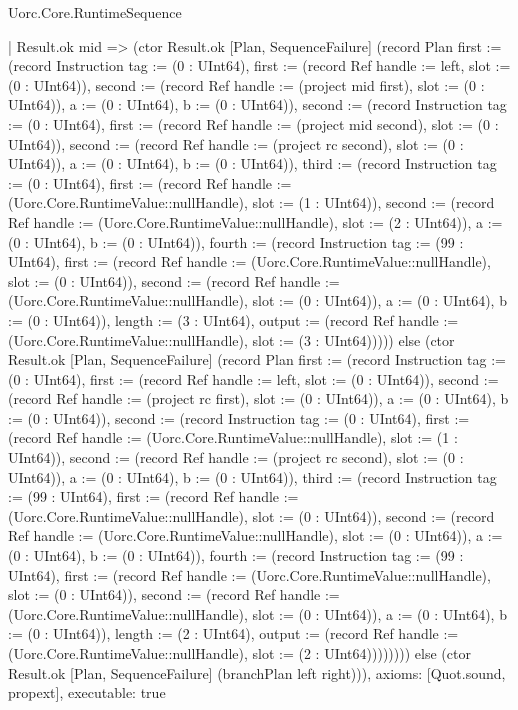 \begin{lexlean}{Uorc.Core.RuntimeSequence}
\begin{semanticmodule}
{          | Result.ok mid => (ctor Result.ok [Plan, SequenceFailure] (record Plan {first := (record Instruction {tag := (0 : UInt64), first := (record Ref {handle := left, slot := (0 : UInt64)}), second := (record Ref {handle := (project mid first), slot := (0 : UInt64)}), a := (0 : UInt64), b := (0 : UInt64)}), second := (record Instruction {tag := (0 : UInt64), first := (record Ref {handle := (project mid second), slot := (0 : UInt64)}), second := (record Ref {handle := (project rc second), slot := (0 : UInt64)}), a := (0 : UInt64), b := (0 : UInt64)}), third := (record Instruction {tag := (0 : UInt64), first := (record Ref {handle := (Uorc.Core.RuntimeValue::nullHandle), slot := (1 : UInt64)}), second := (record Ref {handle := (Uorc.Core.RuntimeValue::nullHandle), slot := (2 : UInt64)}), a := (0 : UInt64), b := (0 : UInt64)}), fourth := (record Instruction {tag := (99 : UInt64), first := (record Ref {handle := (Uorc.Core.RuntimeValue::nullHandle), slot := (0 : UInt64)}), second := (record Ref {handle := (Uorc.Core.RuntimeValue::nullHandle), slot := (0 : UInt64)}), a := (0 : UInt64), b := (0 : UInt64)}), length := (3 : UInt64), output := (record Ref {handle := (Uorc.Core.RuntimeValue::nullHandle), slot := (3 : UInt64)})}))) else (ctor Result.ok [Plan, SequenceFailure] (record Plan {first := (record Instruction {tag := (0 : UInt64), first := (record Ref {handle := left, slot := (0 : UInt64)}), second := (record Ref {handle := (project rc first), slot := (0 : UInt64)}), a := (0 : UInt64), b := (0 : UInt64)}), second := (record Instruction {tag := (0 : UInt64), first := (record Ref {handle := (Uorc.Core.RuntimeValue::nullHandle), slot := (1 : UInt64)}), second := (record Ref {handle := (project rc second), slot := (0 : UInt64)}), a := (0 : UInt64), b := (0 : UInt64)}), third := (record Instruction {tag := (99 : UInt64), first := (record Ref {handle := (Uorc.Core.RuntimeValue::nullHandle), slot := (0 : UInt64)}), second := (record Ref {handle := (Uorc.Core.RuntimeValue::nullHandle), slot := (0 : UInt64)}), a := (0 : UInt64), b := (0 : UInt64)}), fourth := (record Instruction {tag := (99 : UInt64), first := (record Ref {handle := (Uorc.Core.RuntimeValue::nullHandle), slot := (0 : UInt64)}), second := (record Ref {handle := (Uorc.Core.RuntimeValue::nullHandle), slot := (0 : UInt64)}), a := (0 : UInt64), b := (0 : UInt64)}), length := (2 : UInt64), output := (record Ref {handle := (Uorc.Core.RuntimeValue::nullHandle), slot := (2 : UInt64)})})))))) else (ctor Result.ok [Plan, SequenceFailure] (branchPlan left right))),
  axioms: [Quot.sound, propext],
  executable: true
}


\end{semanticmodule}
\end{lexlean}
